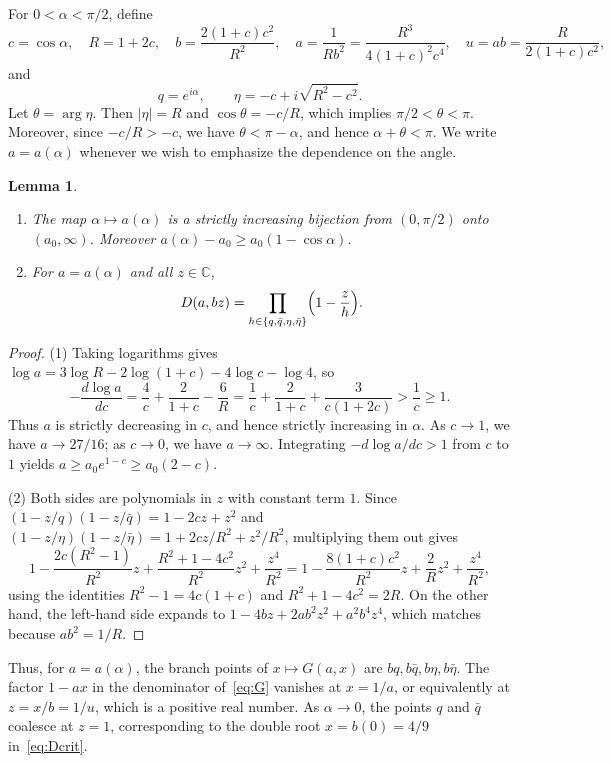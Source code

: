 \documentclass[11pt]{amsart}
\newtheorem{lemma}[theorem]{Lemma}
\theoremstyle{remark}
\begin{document}
For $0<\alpha<\pi/2$, define
\[
 c=\cos\alpha,\quad R=1+2c,\quad b=\frac{2(1+c)c^2}{R^2},\quad
 a=\frac{1}{Rb^2}=\frac{R^3}{4(1+c)^2c^4},\quad u=ab=\frac{R}{2(1+c)c^2},
\]
and
\[
 q=e^{i\alpha},\qquad \eta=-c+i\sqrt{R^2-c^2}.
\]
Let $\theta=\arg\eta$. Then $|\eta|=R$ and $\cos\theta=-c/R$, which implies
$\pi/2<\theta<\pi$. Moreover, since $-c/R>-c$, we have $\theta<\pi-\alpha$,
and hence $\alpha+\theta<\pi$. We write $a=a(\alpha)$ whenever we wish to
emphasize the dependence on the angle.

\begin{lemma}\label{lem:param}
\begin{enumerate}
\item The map $\alpha\mapsto a(\alpha)$ is a strictly increasing bijection
from $(0,\pi/2)$ onto $(a_0,\infty)$. Moreover $a(\alpha)-a_0\ge a_0(1-\cos\alpha)$.
\item For $a=a(\alpha)$ and all $z\in\mathbb C$,
\[
 D(a,bz)=\prod_{h\in\{q,\bar q,\eta,\bar\eta\}}\Bigl(1-\frac zh\Bigr).
\]
\end{enumerate}
\end{lemma}

\begin{proof}
(1) Taking logarithms gives
$\log a=3\log R-2\log(1+c)-4\log c-\log 4$, so
\[
 -\frac{d\log a}{dc}=\frac4c+\frac2{1+c}-\frac6R
 =\frac1c+\frac2{1+c}+\frac{3}{c(1+2c)}>\frac1c\ge1 .
\]
Thus $a$ is strictly decreasing in $c$, and hence strictly increasing in
$\alpha$. As $c\to1$, we have $a\to 27/16$; as $c\to0$, we have
$a\to\infty$. Integrating $-d\log a/dc>1$ from $c$ to $1$ yields
$a\ge a_0e^{1-c}\ge a_0(2-c)$.

(2) Both sides are polynomials in $z$ with constant term $1$. Since
$(1-z/q)(1-z/\bar q)=1-2cz+z^2$ and
$(1-z/\eta)(1-z/\bar\eta)=1+2cz/R^2+z^2/R^2$, multiplying them out gives
\[
 1-\frac{2c(R^2-1)}{R^2}z+\frac{R^2+1-4c^2}{R^2}z^2+\frac{z^4}{R^2}
 =1-\frac{8(1+c)c^2}{R^2}z+\frac{2}{R}z^2+\frac{z^4}{R^2},
\]
using the identities $R^2-1=4c(1+c)$ and $R^2+1-4c^2=2R$. On the other hand,
the left-hand side expands to $1-4bz+2ab^2z^2+a^2b^4z^4$, which matches
because $ab^2=1/R$.
\end{proof}

Thus, for $a=a(\alpha)$, the branch points of $x\mapsto G(a,x)$ are
$bq,b\bar q,b\eta,b\bar\eta$. The factor $1-ax$ in the denominator
of~\eqref{eq:G} vanishes at $x=1/a$, or equivalently at $z=x/b=1/u$, which
is a positive real number. As $\alpha\to0$, the points $q$ and $\bar q$
coalesce at $z=1$, corresponding to the double root $x=b(0)=4/9$
in~\eqref{eq:Dcrit}.
\end{document}
